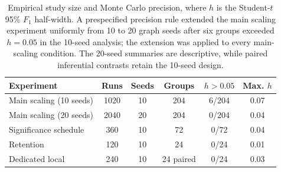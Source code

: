 \begin{table}[t]
\centering
\small
\renewcommand{\arraystretch}{1.13}
\setlength{\tabcolsep}{4pt}
\begin{tabularx}{\textwidth}{@{}L{1.38}C{0.72}C{0.58}C{0.82}C{0.78}C{0.72}@{}}
\toprule
Experiment & Runs & Seeds & Groups & $h>0.05$ & Max. $h$ \\
\midrule
Main scaling (10 seeds) & 1020 & 10 & 204 & 6/204 & 0.07 \\
Main scaling (20 seeds) & 2040 & 20 & 204 & 0/204 & 0.04 \\
Significance schedule & 360 & 10 & 72 & 0/72 & 0.04 \\
Retention & 120 & 10 & 24 & 0/24 & 0.01 \\
Dedicated local & 240 & 10 & 24 paired & 0/24 & 0.03 \\
\bottomrule
\end{tabularx}
\caption{Empirical study size and Monte Carlo precision, where $h$ is the Student-$t$ 95\% $F_1$ half-width. A prespecified precision rule extended the main scaling experiment uniformly from 10 to 20 graph seeds after six groups exceeded $h=0.05$ in the 10-seed analysis; the extension was applied to every main-scaling condition. The 20-seed summaries are descriptive, while paired inferential contrasts retain the 10-seed design.}
\label{tab:evidence-program}
\end{table}
